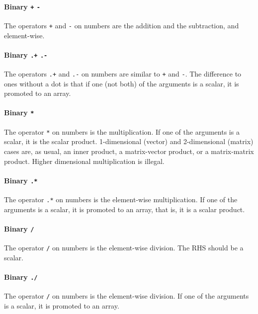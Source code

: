\documentclass[10pt,b5paper]{article}
\begin{document}
\paragraph{Binary {\tt{}+} {\tt{}-}}

The operators \verb'+' and \verb'-' on numbers are the addition and
the subtraction, and element-wise.

\paragraph{Binary {\tt{}.+} {\tt{}.-}}

The operators \verb'.+' and \verb'.-' on numbers are similar to
\verb'+' and \verb'-'.  The difference to ones without a dot is that
if one (not both) of the arguments is a scalar, it is promoted to an
array.

\paragraph{Binary {\tt{}*}}

The operator \verb'*' on numbers is the multiplication.  If one of the
arguments is a scalar, it is the scalar product.  1-dimensional
(vector) and 2-dimensional (matrix) cases are, as usual, an inner
product, a matrix-vector product, or a matrix-matrix product.  Higher
dimensional multiplication is illegal.

\paragraph{Binary {\tt{}.*}}

The operator \verb'.*' on numbers is the element-wise multiplication.
If one of the arguments is a scalar, it is promoted to an array, that
is, it is a scalar product.

\paragraph{Binary {\tt{}/}}

The operator \verb'/' on numbers is the element-wise division.  The
RHS should be a scalar.

\paragraph{Binary {\tt{}./}}

The operator \verb'/' on numbers is the element-wise division.  If one
of the arguments is a scalar, it is promoted to an array.
\end{document}
